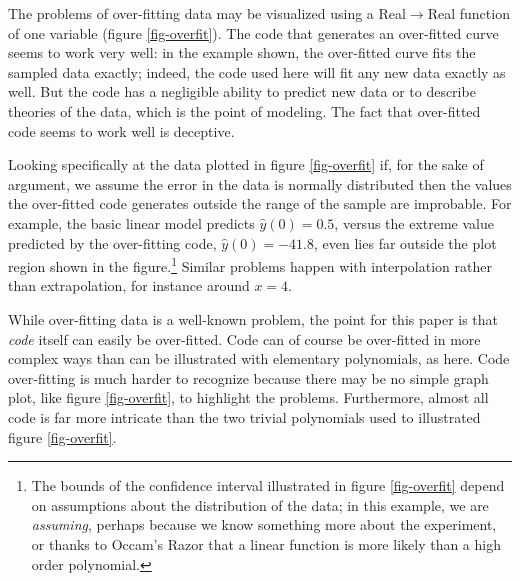 The problems of over-fitting data may be visualized using a Real$\rightarrow$Real function of one variable (figure \ref{fig-overfit}). The code that generates an over-fitted curve seems to work very well: in the example shown, the over-fitted curve fits the sampled data exactly; indeed, the code used here will fit any new data exactly as well. But the code has a negligible ability to predict new data or to describe theories of the data, which is the point of modeling. The fact that over-fitted code seems to work well is deceptive.

Looking specifically at the data plotted in figure \ref{fig-overfit} if, for the sake of argument, we assume the error in the data is normally distributed then the values the over-fitted code generates outside the range of the sample are improbable. For example, the basic linear model predicts
$\hat{y}(0)=0.5$, 
versus the extreme value predicted by the over-fitting code, 
$\hat{y}(0)=-41.8$, 
 even lies far outside the plot region shown in the figure.\footnote{The bounds of the confidence interval illustrated in figure \ref{fig-overfit} depend on assumptions about the distribution of the data; in this example, we are \emph{assuming}, perhaps because we know something more about the experiment, or thanks to Occam's Razor that a linear function is more likely than a high order polynomial.} Similar problems happen with interpolation rather than extrapolation, for instance around $x=4$.

While over-fitting data is a well-known problem, the point for this paper is that \emph{code\/} itself can easily be over-fitted. Code can of course be over-fitted in more complex ways than can be illustrated with elementary polynomials, as here. Code over-fitting is much harder to recognize because there may be no simple graph plot, like figure \ref{fig-overfit}, to highlight the problems. Furthermore, almost all code is far more intricate than the two trivial polynomials used to illustrated figure \ref{fig-overfit}. 

